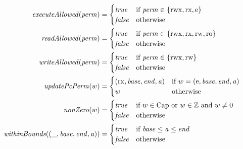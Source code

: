 \documentclass{article}
\newcommand{\false}{\mathit{false}}
\newcommand{\true}{\mathit{true}}
\newcommand{\var}[1]{\mathit{#1}}
\newcommand{\addr}{\var{a}}
\newcommand{\start}{\var{base}}
\newcommand{\addrend}{\var{end}}
\newcommand{\perm}{\var{perm}}
\newcommand{\plainfun}[2]{
  \ifthenelse{\equal{#2}{}}
             {\mathit{#1}}
             {\mathit{#1}(#2)}
}
\newcommand{\updatePcPerm}[1]{\plainfun{updatePcPerm}{#1}}
\newcommand{\executeAllowed}[1]{\plainfun{executeAllowed}{#1}}
\newcommand{\nonZero}[1]{\plainfun{nonZero}{#1}}
\newcommand{\readAllowed}[1]{\plainfun{readAllowed}{#1}}
\newcommand{\writeAllowed}[1]{\plainfun{writeAllowed}{#1}}
\newcommand{\withinBounds}[1]{\plainfun{withinBounds}{#1}}
\newcommand{\plaindom}[1]{\mathrm{#1}}
\newcommand{\Caps}{\plaindom{Cap}}
\newcommand{\ints}{\mathbb{Z}}
\newcommand{\plainperm}[1]{\mathrm{#1}}
\newcommand{\readonly}{\plainperm{ro}}
\newcommand{\readwrite}{\plainperm{rw}}
\newcommand{\exec}{\plainperm{rx}}
\newcommand{\entry}{\plainperm{e}}
\newcommand{\rwx}{\plainperm{rwx}}
\begin{document}
\begin{align*}
  \executeAllowed{\perm} &=
                           \begin{cases}
                             \true & \text{if } \perm \in \{ \rwx, \exec, \entry \} \\
                             \false & \text{otherwise}
                           \end{cases} \\
  \readAllowed{\perm} &=
                           \begin{cases}
                             \true & \text{if } \perm \in \{ \rwx, \exec, \readwrite, \readonly \} \\
                             \false & \text{otherwise}
                           \end{cases} \\
  \writeAllowed{\perm} &=
                           \begin{cases}
                             \true & \text{if } \perm \in \{ \rwx, \readwrite\} \\
                             \false & \text{otherwise}
                           \end{cases} \\
  \updatePcPerm{w} &=
                                     \begin{cases}
                                       (\exec,\start,\addrend,\addr) & \text{if $w = (\entry,\start,\addrend,\addr)$}\\
                                       w & \text{otherwise} 
                                     \end{cases} \\
  \nonZero{w} &=
                \begin{cases}
                  \true & \text{if $w\in \Caps$ or $w\in \ints$ and $w \neq 0$}\\
                  \false & \text{otherwise}
                \end{cases} \\
  \withinBounds{(\_,\start,\addrend,\addr)} &=
                                              \begin{cases}
                                                \true  & \text{if $\start \leq \addr \leq \addrend$} \\
                                                \false & \text{otherwise}
                                              \end{cases} \\

\end{align*}
\end{document}

